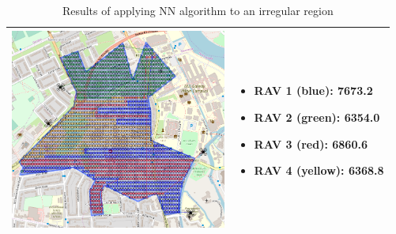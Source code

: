 \begin{table}[h!]
\begin{tabular}{ | c | m{5cm} | }
    \begin{minipage}[c][68mm][c]{.6\textwidth}
      \includegraphics[width=\linewidth, height=66mm]{Chapters/MultiAgentCoverage/MultipleTravellingSalesman/Figs/IrregularRegion/FourRAVSecondAttempt.PNG}
    \end{minipage}
    &
    \begin{itemize}[leftmargin=*]
    \item[] RAV 1 (blue): 7673.2
    \item[] RAV 2 (green): 6354.0
    \item[] RAV 3 (red): 6860.6
    \item[] RAV 4 (yellow): 6368.8
    \end{itemize}
    \\
    \hline
  \end{tabular}
  \caption{Results of applying NN algorithm to an irregular region}\label{table:NNAlgoResultsIrregular}
\end{table}
\pagebreak



































